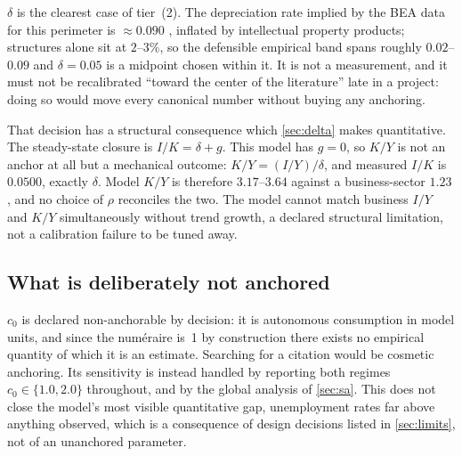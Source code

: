 $\delta$ is the clearest case of tier~(2). The depreciation rate implied by the
BEA data for this perimeter is $\approx 0.090$ \citep{FRED_Depreciation},
inflated by intellectual
property products; structures alone sit at $2$--$3\%$, so the defensible
empirical band spans roughly $0.02$--$0.09$ and $\delta = 0.05$ is a midpoint
chosen within it. It is not a measurement, and it must not be recalibrated
``toward the center of the literature'' late in a project: doing so would move
every canonical number without buying any anchoring.

That decision has a structural consequence which \cref{sec:delta} makes
quantitative. The steady-state closure is $I/K = \delta + g$. This model has
$g = 0$, so $K/Y$ is not an anchor at all but a mechanical outcome:
$K/Y = (I/Y)/\delta$, and measured $I/K$ is $0.0500$, exactly $\delta$. Model
$K/Y$ is therefore $3.17$--$3.64$ against a business-sector $1.23$
\citep{FRED_NetStock}, and no choice of $\rho$ reconciles the two. The model cannot match business
$I/Y$ and $K/Y$ simultaneously without trend growth, a declared structural
limitation, not a calibration failure to be tuned away.

\subsection{What is deliberately not anchored}

$c_0$ is declared non-anchorable by decision: it is autonomous
consumption in model units, and since the numéraire is~1 by construction there
exists no empirical quantity of which it is an estimate. Searching for a
citation would be cosmetic anchoring. Its sensitivity is instead handled by
reporting both regimes $c_0 \in \{1.0, 2.0\}$ throughout, and by the global
analysis of \cref{sec:sa}. This does not close the model's most visible
quantitative gap, unemployment rates far above anything observed, which is
a consequence of design decisions listed in \cref{sec:limits}, not of an
unanchored parameter.
